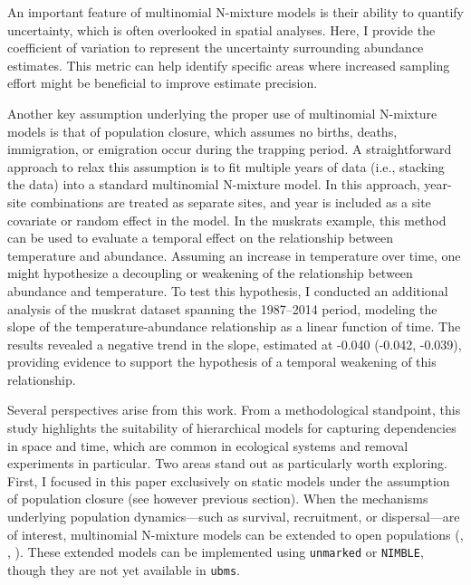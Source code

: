 \documentclass[
  11pt,
  a4paper,
]{article}
\begin{document}
An important feature of multinomial N-mixture models is their ability to quantify uncertainty, which is often overlooked in spatial analyses. Here, I provide the coefficient of variation to represent the uncertainty surrounding abundance estimates. This metric can help identify specific areas where increased sampling effort might be beneficial to improve estimate precision.

Another key assumption underlying the proper use of multinomial N-mixture models is that of population closure, which assumes no births, deaths, immigration, or emigration occur during the trapping period. A straightforward approach to relax this assumption is to fit multiple years of data (i.e., stacking the data) into a standard multinomial N-mixture model. In this approach, year-site combinations are treated as separate sites, and year is included as a site covariate or random effect in the model. In the muskrats example, this method can be used to evaluate a temporal effect on the relationship between temperature and abundance. Assuming an increase in temperature over time, one might hypothesize a decoupling or weakening of the relationship between abundance and temperature. To test this hypothesis, I conducted an additional analysis of the muskrat dataset spanning the 1987--2014 period, modeling the slope of the temperature-abundance relationship as a linear function of time. The results revealed a negative trend in the slope, estimated at -0.040 (-0.042, -0.039), providing evidence to support the hypothesis of a temporal weakening of this relationship.

Several perspectives arise from this work. From a methodological standpoint, this study highlights the suitability of hierarchical models for capturing dependencies in space and time, which are common in ecological systems and removal experiments in particular. Two areas stand out as particularly worth exploring. First, I focused in this paper exclusively on static models under the assumption of population closure (see however previous section). When the mechanisms underlying population dynamics---such as survival, recruitment, or dispersal---are of interest, multinomial N-mixture models can be extended to open populations (, , ). These extended models can be implemented using \texttt{unmarked} or \texttt{NIMBLE}, though they are not yet available in \texttt{ubms}.
\end{document}
